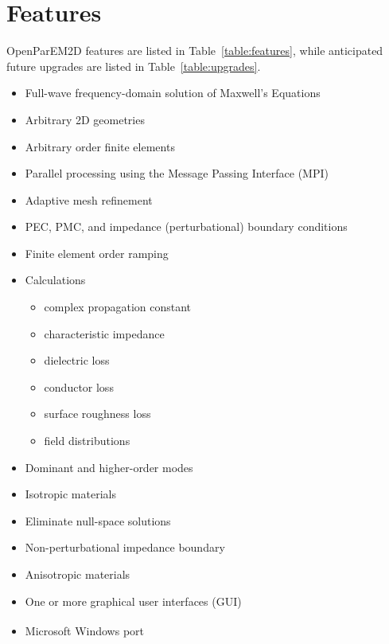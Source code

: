 \documentclass[titlepage]{article}
\renewcommand\_{\textunderscore\linebreak[1]}
\begin{document}
\section{Features}

OpenParEM2D features are listed in Table~\ref{table:features}, while anticipated future upgrades are listed in Table~\ref{table:upgrades}.

\begin{table}[ht]
\caption{OpenParEM2D List of Features}
\noindent \hrulefill
\begin{itemize}[nosep]
  \item Full-wave frequency-domain solution of Maxwell's Equations
  \item Arbitrary 2D geometries
  \item Arbitrary order finite elements
  \item Parallel processing using the Message Passing Interface (MPI)
  \item Adaptive mesh refinement
  \item PEC, PMC, and impedance (perturbational) boundary conditions
  \item Finite element order ramping
  \item Calculations
  \begin{itemize}
    \item complex propagation constant
    \item characteristic impedance
    \item dielectric loss
    \item conductor loss
    \item surface roughness loss
    \item field distributions
  \end{itemize}
  \item Dominant and higher-order modes
  \item Isotropic materials
\end{itemize}
\noindent \hrulefill
\label{table:features}
\end{table}

\begin{table}[ht]
\caption{OpenParEM2D List of Anticipated Future Upgrades}
\noindent \hrulefill
\begin{itemize}[nosep]
   \item Eliminate null-space solutions
   \item Non-perturbational impedance boundary
   \item Anisotropic materials
   \item One or more graphical user interfaces (GUI)
   \item Microsoft Windows\textsuperscript{\textregistered} port
\end{itemize}
\noindent \hrulefill
\label{table:upgrades}
\end{table}
\end{document}
